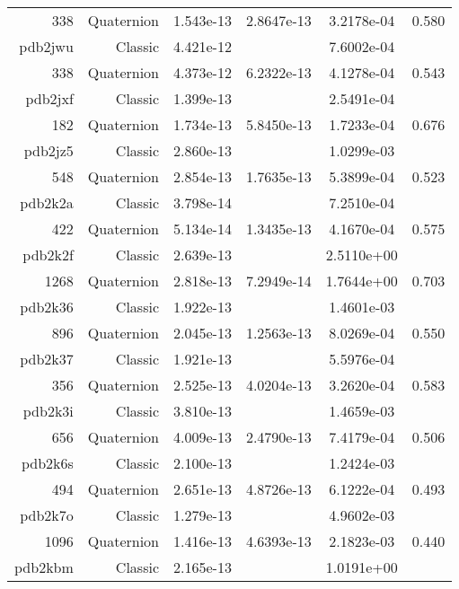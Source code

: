 \begin{xltabular}{\textwidth}{r|rS[table-format=1.3e+2]S[table-format=1.4e+2]S[table-format=1.4e+2]S[table-format=-1.3]}
338 & Quaternion & 1.543e-13 & 2.8647e-13 & 3.2178e-04 & 0.580\\  \addlinespace
{\color{red} pdb2jwu } & Classic & 4.421e-12 &  & 7.6002e-04 & \\
338 & Quaternion & 4.373e-12 & 6.2322e-13 & 4.1278e-04 & 0.543\\  \addlinespace
{\color{red} pdb2jxf } & Classic & 1.399e-13 &  & 2.5491e-04 & \\
182 & Quaternion & 1.734e-13 & 5.8450e-13 & 1.7233e-04 & 0.676\\  \addlinespace
{\color{red} pdb2jz5 } & Classic & 2.860e-13 &  & 1.0299e-03 & \\
548 & Quaternion & 2.854e-13 & 1.7635e-13 & 5.3899e-04 & 0.523\\  \addlinespace
{\color{red} pdb2k2a } & Classic & 3.798e-14 &  & 7.2510e-04 & \\
422 & Quaternion & 5.134e-14 & 1.3435e-13 & 4.1670e-04 & 0.575\\  \addlinespace
{\color{red} pdb2k2f } & Classic & 2.639e-13 &  & 2.5110e+00 & \\
1268 & Quaternion & 2.818e-13 & 7.2949e-14 & 1.7644e+00 & 0.703\\  \addlinespace
{\color{red} pdb2k36 } & Classic & 1.922e-13 &  & 1.4601e-03 & \\
896 & Quaternion & 2.045e-13 & 1.2563e-13 & 8.0269e-04 & 0.550\\  \addlinespace
{\color{red} pdb2k37 } & Classic & 1.921e-13 &  & 5.5976e-04 & \\
356 & Quaternion & 2.525e-13 & 4.0204e-13 & 3.2620e-04 & 0.583\\  \addlinespace
{\color{red} pdb2k3i } & Classic & 3.810e-13 &  & 1.4659e-03 & \\
656 & Quaternion & 4.009e-13 & 2.4790e-13 & 7.4179e-04 & 0.506\\  \addlinespace
{\color{red} pdb2k6s } & Classic & 2.100e-13 &  & 1.2424e-03 & \\
494 & Quaternion & 2.651e-13 & 4.8726e-13 & 6.1222e-04 & 0.493\\  \addlinespace
{\color{red} pdb2k7o } & Classic & 1.279e-13 &  & 4.9602e-03 & \\
1096 & Quaternion & 1.416e-13 & 4.6393e-13 & 2.1823e-03 & 0.440\\  \addlinespace
{\color{red} pdb2kbm } & Classic & 2.165e-13 &  & 1.0191e+00 & \\

\end{xltabular}
